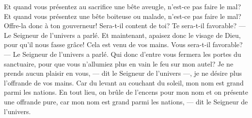 Et quand vous présentez au sacrifice une bête aveugle,
	n’est-ce pas faire le mal?
Et quand vous présentez une bête boiteuse ou malade,
	n’est-ce pas faire le mal?
Offre-la donc à ton gouverneur!
	Sera-t-il content de toi? Te sera-t-il favorable?
	--- Le Seigneur de l’univers a parlé.
Et maintenant, apaisez donc le visage de Dieu, pour qu’il nous fasse grâce!
	Cela est venu de vos mains.
Vous sera-t-il favorable? --- Le Seigneur de l’univers a parlé.
Qui donc d’entre vous fermera les portes du sanctuaire,
	pour que vous n’allumiez plus en vain le feu sur mon autel?
Je ne prends aucun plaisir en vous, --- dit le Seigneur de l’univers ---,
	je ne désire plus l’offrande de vos mains.
Car du levant au couchant du soleil, mon nom est grand parmi les nations.
En tout lieu, on brûle de l’encens pour mon nom et on présente une offrande pure,
	car mon nom est grand parmi les nations, --- dit le Seigneur de l’univers.